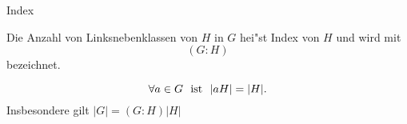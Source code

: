 \documentclass[class=article, crop=false]{standalone}
\begin{document}
\begin{zettel}{Index}
\begin{flashcard}
    \begin{definition}[Index]
        Die Anzahl von Linksnebenklassen von $H$ in $G$ hei"st Index von $H$ und wird mit 
        \[
            (G:H)
        \]
        bezeichnet.  
    \end{definition}
\end{flashcard}
\begin{theorem}
    \[
        \forall a \in  G \tx{ ist } |aH| = |H|
    .\]
    Insbesondere gilt $ |G| = (G:H) |H|$ 
\end{theorem}
\end{zettel}
\end{document}
